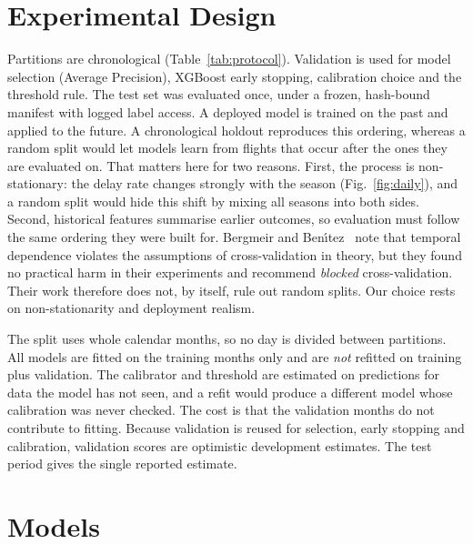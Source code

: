 \documentclass[conference]{IEEEtran}
\begin{document}
\section{Experimental Design}\label{sec:design}
Partitions are chronological (Table~\ref{tab:protocol}). Validation is used for model selection
(Average Precision), XGBoost early stopping, calibration choice and the threshold rule. The test
set was evaluated once, under a frozen, hash-bound manifest with logged label access.
A deployed model is trained on the past and applied to the future. A chronological holdout
reproduces this ordering, whereas a random split would let models learn from flights that occur
after the ones they are evaluated on. That matters here for two reasons. First, the process is
non-stationary: the delay rate changes strongly with the season (Fig.~\ref{fig:daily}), and a
random split would hide this shift by mixing all seasons into both sides. Second, historical
features summarise earlier outcomes, so evaluation must follow the same ordering they were built
for. Bergmeir and Ben\'{\i}tez~\cite{bergmeir2012} note that temporal dependence violates the
assumptions of cross-validation in theory, but they found no practical harm in their experiments
and recommend \emph{blocked} cross-validation. Their work therefore does not, by itself, rule out
random splits. Our choice rests on non-stationarity and deployment realism.

The split uses whole calendar months, so no day is divided between partitions. All models are
fitted on the training months only and are \emph{not} refitted on training plus validation. The
calibrator and threshold are estimated on predictions for data the model has not seen, and a refit
would produce a different model whose calibration was never checked. The cost is that the
validation months do not contribute to fitting. Because validation is reused for selection, early
stopping and calibration, validation scores are optimistic development estimates. The test period
gives the single reported estimate.


\section{Models}\label{sec:models}
\end{document}

